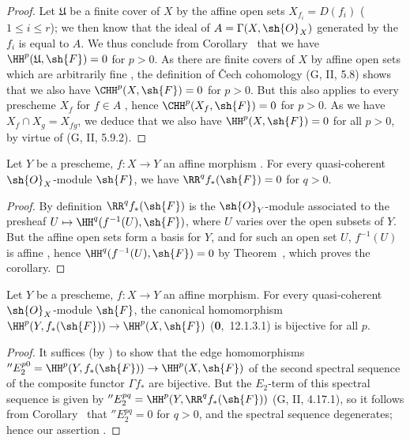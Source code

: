 \begin{proof}
Let $\mathfrak{U}$ be a finite cover of $X$ by the affine open sets $X_{f_i}=D(f_i)$ ($1\leq i\leq r$); we then know that the ideal of $A=\Gamma(X,\sh{O}_X)$ generated by the $f_i$ is equal to $A$.
We thus conclude from Corollary~ that we have $\HH^p(\mathfrak{U},\sh{F})=0$ for $p>0$.
As there are finite covers of $X$ by affine open sets which are arbitrarily fine , the definition of \v Cech cohomology (G, II, 5.8) shows that we also have $\CHH^p(X,\sh{F})=0$ for $p>0$.
But this also applies to every prescheme $X_f$ for $f\in A$ , hence $\CHH^p(X_f,\sh{F})=0$ for $p>0$.
As we have $X_f\cap X_g=X_{fg}$, we deduce that we also have $\HH^p(X,\sh{F})=0$ for all $p>0$, by virtue of (G, II, 5.9.2).
\end{proof}

\begin{corollary}[1.3.2]
\label{III.1.3.2}
Let $Y$ be a prescheme, $f:X\to Y$ an affine morphism .
For every quasi-coherent $\sh{O}_X$-module $\sh{F}$, we have $\RR^q f_*(\sh{F})=0$ for $q>0$.
\end{corollary}

\begin{proof}
By definition $\RR^q f_*(\sh{F})$ is the $\sh{O}_Y$-module associated to the presheaf $U\mapsto\HH^q(f^{-1}(U),\sh{F})$, where $U$ varies over the open subsets of $Y$.
But the affine open sets form a basis for $Y$, and for such an open set $U$, $f^{-1}(U)$ is affine , hence $\HH^q(f^{-1}(U),\sh{F})=0$ by Theorem~, which proves the corollary.
\end{proof}

\begin{corollary}[1.3.3]
\label{III.1.3.3}
Let $Y$ be a prescheme, $f:X\to Y$ an affine morphism.
For every quasi-coherent $\sh{O}_X$-module $\sh{F}$, the canonical homomorphism $\HH^p(Y,f_*(\sh{F}))\to\HH^p(X,\sh{F})$ (\textbf{0},~12.1.3.1) is bijective for all $p$.
\end{corollary}

\begin{proof}
It suffices (by ) to show that the edge homomorphisms $''E_2^{p0}=\HH^p(Y,f_*(\sh{F}))\to\HH^p(X,\sh{F})$ of the second spectral sequence of the composite functor $\Gamma f_*$ are bijective.
But the $E_2$-term of this spectral sequence is given by $''E_2^{pq}=\HH^p(Y,\RR^q f_*(\sh{F}))$ (G, II, 4.17.1), so it follows from Corollary~ that $''E_2^{pq}=0$ for $q>0$, and the spectral sequence degenerates; hence our assertion .
\end{proof}

